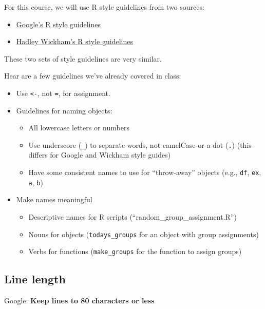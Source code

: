 \documentclass[]{book}
\providecommand{\tightlist}{%
  \setlength{\itemsep}{0pt}\setlength{\parskip}{0pt}}
\begin{document}
For this course, we will use R style guidelines from two sources:

\begin{itemize}
\tightlist
\item
  \href{https://google.github.io/styleguide/Rguide.xml}{Google's R style
  guidelines}
\item
  \href{http://adv-r.had.co.nz/Style.html}{Hadley Wickham's R style
  guidelines}
\end{itemize}

These two sets of style guidelines are very similar.

Hear are a few guidelines we've already covered in class:

\begin{itemize}
\tightlist
\item
  Use \texttt{\textless{}-}, not \texttt{=}, for assignment.
\item
  Guidelines for naming objects:

  \begin{itemize}
  \tightlist
  \item
    All lowercase letters or numbers
  \item
    Use underscore (\texttt{\_}) to separate words, not camelCase or a
    dot (\texttt{.}) (this differs for Google and Wickham style guides)
  \item
    Have some consistent names to use for ``throw-away'' objects (e.g.,
    \texttt{df}, \texttt{ex}, \texttt{a}, \texttt{b})
  \end{itemize}
\item
  Make names meaningful

  \begin{itemize}
  \tightlist
  \item
    Descriptive names for R scripts (``random\_group\_assignment.R'')
  \item
    Nouns for objects (\texttt{todays\_groups} for an object with group
    assignments)
  \item
    Verbs for functions (\texttt{make\_groups} for the function to
    assign groups)
  \end{itemize}
\end{itemize}

\subsection{Line length}\label{line-length}

Google: \textbf{Keep lines to 80 characters or less} \medskip
\end{document}
